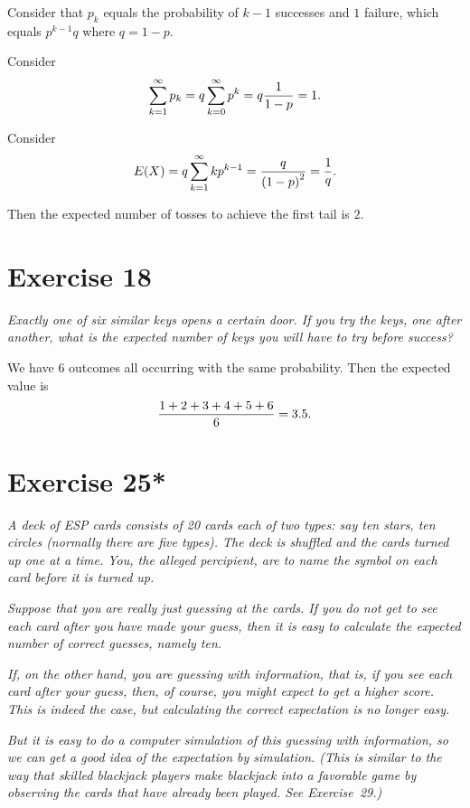 \documentclass{abrice}
\begin{document}
\bigskip

Consider that $p_k$ equals the probability of $k-1$ successes and $1$
failure, which equals $p^{k-1} q$ where $q = 1 - p$.

Consider
\[
\sum_{k=1}^{\infty} p_k = q \sum_{k=0}^{\infty} p^k = q {1 \over 1 -
  p} = 1.
\]

Consider
\[
E(X) = q \sum_{k=1}^{\infty} k p^{k - 1} = {q \over {(1 - p)}^2} = {1
  \over q}.
\]

Then the expected number of tosses to achieve the first tail is $2$.

\section{Exercise 18}

\emph{Exactly one of six similar keys opens a certain door. If you try
the keys, one after another, what is the expected number of keys you
will have to try before success?}

\bigskip

We have $6$ outcomes all occurring with the same probability. Then the
expected value is
\[
{1 + 2 + 3 + 4 + 5 + 6 \over 6} = 3.5.
\]

\section{Exercise 25*}

\emph{A deck of ESP cards consists of 20 cards each of two types: say
  ten stars, ten circles (normally there are five types).  The deck is
  shuffled and the cards turned up one at a time.  You, the alleged
  percipient, are to name the symbol on each card \emph{before} it is
  turned up.}

\emph{Suppose that you are really just guessing at the cards.  If you
  do not get to see each card after you have made your guess, then it
  is easy to calculate the expected number of correct guesses, namely
  ten.}

\emph{If, on the other hand, you are guessing with information, that
  is, if you see each card after your guess, then, of course, you
  might expect to get a higher score.  This is indeed the case, but
  calculating the correct expectation is no longer easy.}

\emph{But it is easy to do a computer simulation of this guessing with
  information, so we can get a good idea of the expectation by
  simulation.  (This is similar to the way that skilled blackjack
  players make blackjack into a favorable game by observing the cards
  that have already been played.  See Exercise~29.)}
\end{document}
